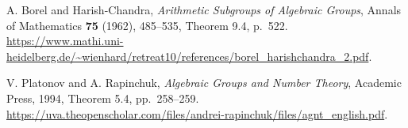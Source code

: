A. Borel and Harish-Chandra,
\emph{Arithmetic Subgroups of Algebraic Groups},
Annals of Mathematics \textbf{75} (1962), 485--535,
Theorem 9.4, p.~522.
\url{https://www.mathi.uni-heidelberg.de/~wienhard/retreat10/references/borel_harishchandra_2.pdf}.

V. Platonov and A. Rapinchuk,
\emph{Algebraic Groups and Number Theory}, Academic Press, 1994,
Theorem 5.4, pp.~258--259.
\url{https://uva.theopenscholar.com/files/andrei-rapinchuk/files/agnt_english.pdf}.
